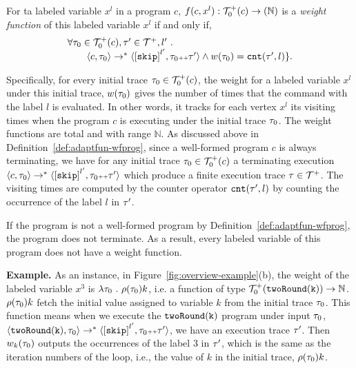 \begin{defn}
 \label{def:lvar_weight} For ta labeled variable $x^l$ in a program $c$,
$f({c}, x^l): \mathcal{T}^{+}_0(c) \to (\mathbb{N})$ is a \emph{weight function} of this labeled
variable $x^l$ if and only if,
\[
 \begin{array}{l}
 \forall \trace_0 \in \ftdom_0(c), \trace' \in \ftdom, l' \sthat 
 \\ \qquad 
 \config{{c}, \trace_0} \to^{*} 
 \config{\clabel{\eskip}^{l'}, \trace_0 \tracecat \trace'} 
 \land w(\trace_0) = \vcounter(\trace', l) \}. 
 \end{array}
 \]
\end{defn}
Specifically, for every initial trace $\mathtt{\tau}_0 \in \mathcal{T}^{+}_0(c)$,
the weight for a labeled variable $x^l$ under this initial trace, $w(\mathtt{\tau}_0)$
gives the number of times that the command with the label $l$ is evaluated.
In other words, it tracks for each vertex $x^l$ its visiting times 
 when the program $c$ is executing under the initial trace $\mathtt{\tau}_0$.
 The weight functions are total and with range $\mathbb{N}$. 
 As discussed above in Definition~\ref{def:adaptfun-wfprog}, since a well-formed program $c$ is always terminating, we have
 for any initial trace $\mathtt{\tau}_0 \in \mathcal{T}^{+}_0(c)$ a terminating execution 
 $\config{{c}, \trace_0} \to^{*} \config{\clabel{\eskip}^{l'}, \trace_0\tracecat\trace'} $
 which produce a finite execution trace $\mathtt{\tau} \in \mathcal{T}^{+}$.
The visiting times are computed by the counter operator $\mathtt{cnt}(\mathtt{\tau}', l)$
by counting the occurrence of the label $l$ in $\mathtt{\tau}'$.

If the program is not a well-formed program by Definition~\ref{def:adaptfun-wfprog}, the program does not terminate.
As a result, every labeled variable of this program does not have a weight function.

\textbf{Example.} 
As an instance, in Figure~\ref{fig:overview-example}(b), the weight of the labeled variable $x^3$ is 
$\lambda \mathtt{\tau}_0 ~.~ \rho(\mathtt{\tau}_0) k$, i.e.
a function of type $\mathcal{T}^{+}_0(\mathtt{twoRound(k)}) \to \mathbb{N}$.
$\rho(\mathtt{\tau}_0) k$ fetch the initial value assigned to variable $k$ from the initial trace $\mathtt{\tau}_0$.
This function means when 
we execute the $\mathtt{twoRound(k)}$ program under input $\mathtt{\tau}_0$, 
$\config{\kw{twoRound(k)}, \trace_0} \to^{*} \config{\clabel{\eskip}^{l'}, \trace_0\tracecat\trace'} $,
we have an execution trace $\mathtt{\tau}'$.
Then $w_k(\mathtt{\tau}_0)$ outputs the occurrences of the label $3$ in $\mathtt{\tau}'$, which is 
the same as the iteration numbers of the loop,
i.e., the value of $k$ in the initial trace, $\rho(\mathtt{\tau}_0) k$.


